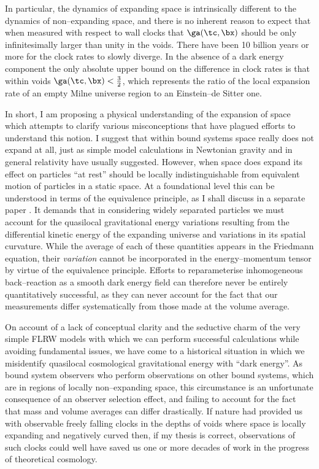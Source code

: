 \documentclass[12pt]{iopart}
\begin{document}
In particular, the dynamics
of expanding space is intrinsically different to the dynamics of
non--expanding space, and there is no inherent reason to expect
that when measured with respect to wall clocks that $\ga(\tc,\bx)$ should
be only infinitesimally larger than unity in the voids. There have been
10 billion years or more for the clock rates to slowly diverge. In the
absence of a dark energy component the only absolute upper bound on
the difference in clock rates is that within voids $\ga(\tc,\bx)<\frac32$,
which represents the ratio of the local expansion rate of an empty Milne
universe region to an Einstein--de Sitter one.

In short, I am proposing a physical understanding of the expansion of space
which attempts to clarify various misconceptions that have plagued
efforts to understand this notion. I suggest that within bound systems
space really does not expand at all, just as simple model calculations in
Newtonian gravity \cite{Price} and in general relativity \cite{gruyere} have
usually suggested. However, when space does expand
its effect on particles ``at rest'' should be locally indistinguishable from
equivalent motion of particles in a static space. At a foundational
level this can be understood in terms of the equivalence principle,
as I shall discuss in a separate paper \cite{equiv}. It demands that in
considering widely separated particles we must account for the quasilocal
gravitational energy variations resulting from the differential
kinetic energy of the expanding universe and variations in its spatial
curvature. While the average of each of these quantities appears in
the Friedmann equation, their {\em variation} cannot be
incorporated in the energy--momentum tensor by virtue of the equivalence
principle. Efforts to reparameterise inhomogeneous back--reaction
as a smooth dark energy field \cite{morpho} can therefore never be entirely
quantitatively successful, as they can never account for the fact
that our measurements differ systematically from those made at the volume
average.

On account of a lack of conceptual clarity and the seductive charm of the
very simple FLRW models with which we can perform successful calculations
while avoiding fundamental issues, we have come to a historical situation in
which we misidentify quasilocal cosmological
gravitational energy with ``dark energy''. As bound system observers who
perform observations on other bound systems, which are in regions of
locally non--expanding space, this circumstance is an unfortunate
consequence of an observer selection effect, and failing to account for
the fact that mass and volume averages can differ drastically. If nature
had provided us with observable freely falling clocks in the depths of
voids where space is locally expanding and negatively curved then, if my
thesis is correct, observations of such clocks could well have saved us
one or more decades of work in the progress of theoretical cosmology.
\end{document}
